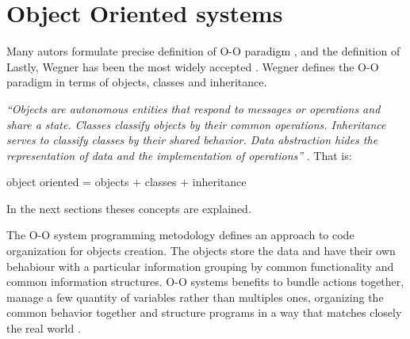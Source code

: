 \section{Object Oriented systems}



Many autors formulate precise 
definition of O-O paradigm 
\cite{Rentsch:1982} 
\cite{Pascoe:1986}
\cite{Nygaard:1986}
\cite{Madsen:1988}, 
and the definition of Lastly, Wegner 
\cite{Wegner:1987} has been 
the most widely 
accepted \cite{Capretz:2003}. Wegner defines 
the O-O paradigm in terms of objects, 
classes and inheritance.

\emph{
	``Objects are autonomous entities 
	that respond to messages or operations and share 
	a state. Classes classify objects by their common 
	operations. Inheritance serves to classify classes by 
	their shared behavior. Data abstraction hides the 
	representation of data and the implementation of 
	operations'' 
}\cite{Wegner:1987}. That is: 

object oriented = objects + classes + inheritance

In the next sections theses concepts are explained.

The O-O system programming metodology 
defines an approach to code organization 
for objects creation. 
The objects store the data and 
have their own behabiour with a 
particular information grouping 
by common functionality and common 
information structures. 
O-O systems benefits 
to bundle actions together, 
manage a few quantity of variables rather 
than multiples ones, 
organizing the 
common behavior together and 
structure programs in a way that
matches closely 
the real world \cite{Adobe:AS3man2008}. 

